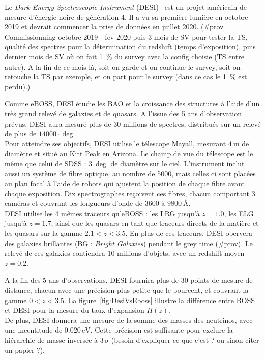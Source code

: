 Le \emph{Dark Energy Spectroscopic Instrument} (DESI)~\cite{DESICollaboration2016} est un projet américain de mesure d'énergie noire de génération 4. Il a vu sa première lumière en octobre 2019 et devrait commencer la prise de données en juillet 2020. (\#prov Commissionning octobre 2019 - fev 2020 puis 3 mois de SV pour tester la TS, qualité des spectres pour la détermination du redshift (temps d'exposition), puis dernier mois de SV o\`u on fait \SI{1}{\percent} du survey avec la config choisie (TS entre autre). A la fin de ce mois là, soit on garde et on continue le survey, soit on retouche la TS par exemple, et on part pour le survey (dans ce cas le \SI{1}{\percent} est perdu).)

Comme eBOSS, DESI étudie les BAO et la croissance des structures à l'aide d'un très grand relevé de galaxies et de quasars. A l'issue des 5 ans d'observation prévus, DESI aura mesuré plus de 30 millions de spectres, distribués sur un relevé de plus de $\SI{14000}{\square\deg}$. \\
Pour atteindre ses objectifs, DESI utilise le télescope Mayall, mesurant $\SI{4}{\meter}$ de diamètre et situé au Kitt Peak en Arizona. Le champ de vue du télescope est le même que celui de SDSS : $\SI{3}{\deg}$ de diamètre sur le ciel. L'instrument inclut aussi un système de fibre optique, au nombre de \num{5000}, mais celles ci sont placées au plan focal à l'aide de robots qui ajustent la position de chaque fibre avant chaque exposition. Dix spectrographes reçoivent ces fibres, chacun comportant 3 caméras et couvrant les longueurs d'onde de \num{3600} à $\SI{9800}{\angstrom}$. \\
‌‌DESI utilise les 4 mêmes traceurs qu'eBOSS : les LRG jusqu'à $z=\num{1,0}$, les ELG jusqu'à $z=\num{1,7}$, ainsi que les quasars en tant que traceurs directs de la matière et les quasars \lya{} sur la gamme $\num{2,1} < z < \num{3,5}$. En plus de ces traceurs, DESI obervera des galaxies brillantes (BG : \emph{Bright Galaxies}) pendant le grey time (\#prov). Le relevé de ces galaxies contiendra 10 millions d'objets, avec un redshift moyen $z=\num{0,2}$.

A la fin des 5 ans d'observations, DESI fournira plus de 30 points de mesure de distance, chacun avec une précision plus petite que le pourcent, et couvrant la gamme $\num{0}< z < \num{3.5}$. La figure~\ref{fig:DesiVsEboss} illustre la différence entre BOSS et DESI pour la mesure du taux d'expansion $H(z)$.\\
De plus, DESI donnera une mesure de la somme des masses des neutrinos, avec une incentitude de $\num{0,020}\,\mathrm{eV}$. Cette précision est suffisante pour exclure la hiérarchie de masse inversée à $3\,\sigma$ (besoin d'expliquer ce que c'est ? ou sinon citer un papier ?).


